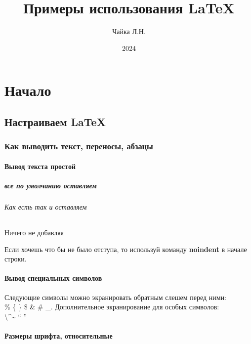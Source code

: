 \documentclass[a4paper,14pt]{book}
\title{Примеры использования \LaTeX}
\author{Чайка Л.Н.}
\date{2024}
\begin{document}
\layout

\maketitle %

\part{Начало}

\chapter{Настраиваем \LaTeX}

\section{Как выводить текст, переносы, абзацы}

\subsection{Вывод текста простой}

\subsubsection{все по умолчанию оставляем}

\paragraph{Как есть так и оставляем}

\subparagraph{Ничего не добавляя}
Если хочешь что бы не было отступа, то используй команду
\textbf{noindent} в начале строки.\newline
\subsection{Вывод специальных символов}
Следующие символы можно экранировать обратным слешем
перед ними: \\
\% \{ \} \$ \& \# \_. Дополнительное экранирование для особых
символов: \\ \textbackslash  \textasciicircum \~{}  `` ''

\subsection{Размеры шрифта, относительные}
\end{document}
